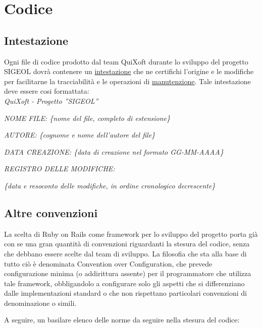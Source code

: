 \documentclass[11pt,a4paper]{article}
\begin{document}
\section{Codice}
\subsection{Intestazione}
Ogni file di codice prodotto dal team QuiXoft durante lo sviluppo del progetto SIGEOL dovrà contenere un \underline{intestazione} che ne certifichi l'origine e le modifiche per facilitarne la tracciabilità e le operazioni di \underline{manutenzione}.
Tale intestazione deve essere cosi formattata: \\

\textit{QuiXoft - Progetto ''SIGEOL''}

\textit{NOME FILE: \{nome del file, completo di estensione\}}

\textit{AUTORE: \{cognome e nome dell'autore del file\}}

\textit{DATA CREAZIONE: \{data di creazione nel formato GG-MM-AAAA\}}

\textit{REGISTRO DELLE MODIFICHE:}

\textit{\{data e resoconto delle modifiche, in ordine cronologico decrescente\}}
\subsection{Altre convenzioni}
La scelta di Ruby on Rails come framework per lo sviluppo del progetto porta già con se una gran quantità di convenzioni riguardanti la stesura del codice, senza che debbano essere scelte dal team di sviluppo.
La filosofia che sta alla base di tutto ciò è denominata Convention over Configuration, che prevede configurazione minima (o addirittura assente) per il programmatore che utilizza tale framework, obbligandolo a configurare solo gli aspetti che si differenziano dalle implementazioni standard o che non rispettano particolari convenzioni di denominazione o simili.

A seguire, un basilare elenco delle norme da seguire nella stesura del codice:
\end{document}
